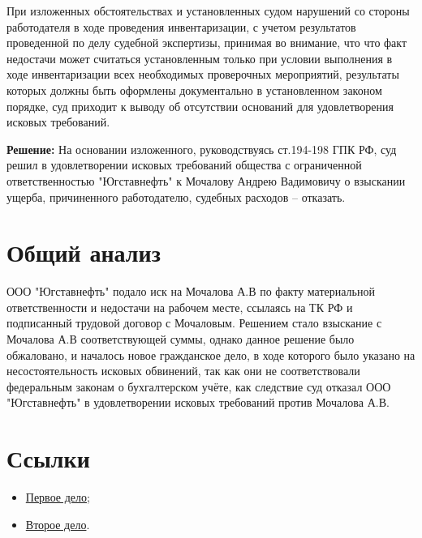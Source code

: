 \documentclass[a4paper]{article}
\begin{document}
		При изложенных обстоятельствах и установленных судом нарушений со стороны работодателя в ходе проведения инвентаризации, с учетом результатов проведенной по делу судебной экспертизы, принимая во внимание, что что факт недостачи может считаться установленным только при условии выполнения в ходе инвентаризации всех необходимых проверочных мероприятий, результаты которых должны быть оформлены документально в установленном законом порядке, суд приходит к выводу об отсутствии оснований для удовлетворения исковых требований.
			
		\textbf{Решение:} На основании изложенного, руководствуясь ст.194-198 ГПК РФ, суд решил в удовлетворении исковых требований общества с ограниченной ответственностью "Югставнефть" к Мочалову Андрею Вадимовичу о взыскании ущерба, причиненного работодателю, судебных расходов – отказать.
			
	\section{Общий анализ}
		ООО "Югставнефть" подало иск на Мочалова А.В по факту материальной ответственности и недостачи на рабочем месте, ссылаясь на ТК РФ и подписанный трудовой договор с Мочаловым. Решением стало взыскание с Мочалова А.В соответствующей суммы, однако данное решение было обжаловано, и началось новое гражданское дело, в ходе которого было указано на несостоятельность исковых обвинений, так как они не соответствовали федеральным законам о бухгалтерском учёте, как следствие суд отказал ООО "Югставнефть" в удовлетворении исковых требований против Мочалова А.В.
		
	\section{Ссылки}
		\begin{itemize}
			\item \href{https://lenynsky--stv.sudrf.ru/modules.php?name=sud_delo&srv_num=1&name_op=case&n_c=1&case_id=393221682&case_uid=dbca7bee-9952-41e9-a827-c492f71cf459&delo_id=1540005&new=0}{Первое дело};
			
			\item \href{https://lenynsky--stv.sudrf.ru/modules.php?name=sud_delo&srv_num=1&name_op=case&case_id=393275451&case_uid=d4cac6ef-7851-4aa5-9c3a-69b1daea27ca&delo_id=1540005}{Второе дело}.
		\end{itemize}
\end{document}
